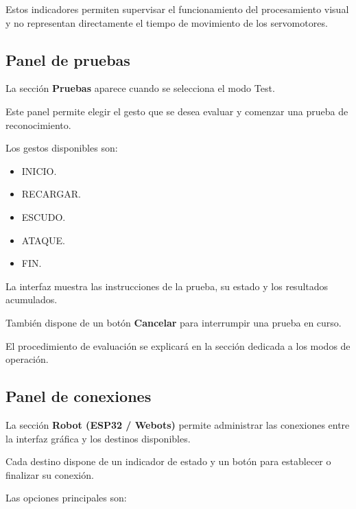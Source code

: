 \documentclass[letterpaper,journal]{IEEEtran}
\begin{document}
Estos indicadores permiten supervisar
el funcionamiento del procesamiento
visual y no representan directamente
el tiempo de movimiento de los
servomotores.

\subsection{Panel de pruebas}

La sección \textbf{Pruebas} aparece
cuando se selecciona el modo Test.

Este panel permite elegir el gesto que
se desea evaluar y comenzar una prueba
de reconocimiento.

Los gestos disponibles son:

\begin{itemize}
    \item INICIO.
    \item RECARGAR.
    \item ESCUDO.
    \item ATAQUE.
    \item FIN.
\end{itemize}

La interfaz muestra las instrucciones
de la prueba, su estado y los resultados
acumulados.

También dispone de un botón
\textbf{Cancelar} para interrumpir
una prueba en curso.

El procedimiento de evaluación
se explicará en la sección dedicada
a los modos de operación.

\subsection{Panel de conexiones}

La sección \textbf{Robot (ESP32 / Webots)}
permite administrar las conexiones
entre la interfaz gráfica y los
destinos disponibles.

Cada destino dispone de un indicador
de estado y un botón para establecer
o finalizar su conexión.

Las opciones principales son:
\end{document}
